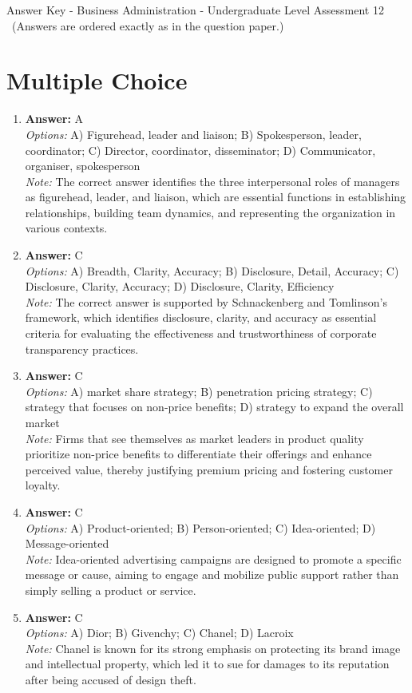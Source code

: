 \documentclass[12pt]{article}
\begin{document}
\begin{center}
Answer Key - Business Administration - Undergraduate Level Assessment 12 \
\small (Answers are ordered exactly as in the question paper.)
\end{center}

\section*{Multiple Choice}
\begin{enumerate}[label=\arabic*.]
\item \textbf{Answer:} A
\\ \textit{Options:} A) Figurehead, leader and liaison; B) Spokesperson, leader, coordinator; C) Director, coordinator, disseminator; D) Communicator, organiser, spokesperson
\\ \textit{Note:} The correct answer identifies the three interpersonal roles of managers as figurehead, leader, and liaison, which are essential functions in establishing relationships, building team dynamics, and representing the organization in various contexts.
\item \textbf{Answer:} C
\\ \textit{Options:} A) Breadth, Clarity, Accuracy; B) Disclosure, Detail, Accuracy; C) Disclosure, Clarity, Accuracy; D) Disclosure, Clarity, Efficiency
\\ \textit{Note:} The correct answer is supported by Schnackenberg and Tomlinson's framework, which identifies disclosure, clarity, and accuracy as essential criteria for evaluating the effectiveness and trustworthiness of corporate transparency practices.
\item \textbf{Answer:} C
\\ \textit{Options:} A) market share strategy; B) penetration pricing strategy; C) strategy that focuses on non-price benefits; D) strategy to expand the overall market
\\ \textit{Note:} Firms that see themselves as market leaders in product quality prioritize non-price benefits to differentiate their offerings and enhance perceived value, thereby justifying premium pricing and fostering customer loyalty.
\item \textbf{Answer:} C
\\ \textit{Options:} A) Product-oriented; B) Person-oriented; C) Idea-oriented; D) Message-oriented
\\ \textit{Note:} Idea-oriented advertising campaigns are designed to promote a specific message or cause, aiming to engage and mobilize public support rather than simply selling a product or service.
\item \textbf{Answer:} C
\\ \textit{Options:} A) Dior; B) Givenchy; C) Chanel; D) Lacroix
\\ \textit{Note:} Chanel is known for its strong emphasis on protecting its brand image and intellectual property, which led it to sue for damages to its reputation after being accused of design theft.
\end{enumerate}
\end{document}
